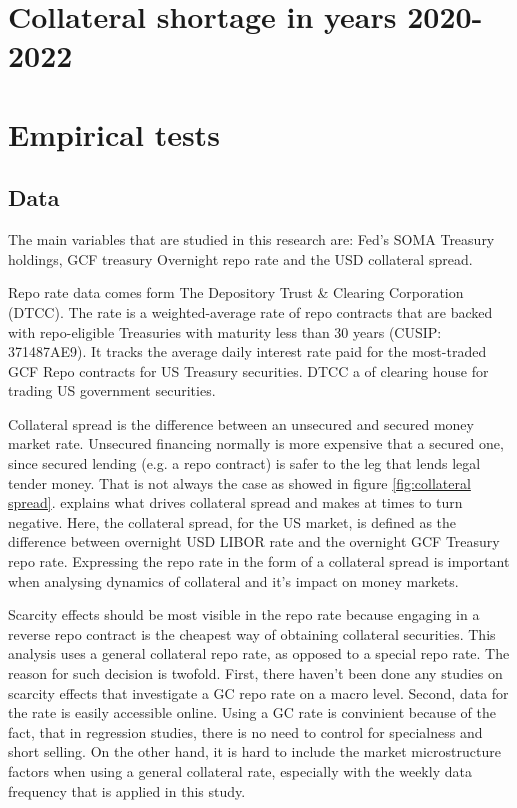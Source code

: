 \documentclass[11pt,a4paper,english,oneside]{article}
\begin{document}
\newpage

\section{Collateral shortage in years 2020-2022} \label{sec:shortage}%

\newpage

\section{Empirical tests} \label{sec:empirical}

\subsection{Data} %

The main variables that are studied in this research are: Fed's SOMA Treasury holdings, GCF treasury Overnight repo rate and the USD collateral spread.

Repo rate data comes form The Depository Trust \& Clearing Corporation (DTCC). The rate is a weighted-average rate of repo contracts that are backed with repo-eligible Treasuries with maturity less than 30 years (CUSIP: 371487AE9). It tracks the average daily interest rate paid for the most-traded GCF Repo contracts for US Treasury securities. DTCC a of clearing house for trading US government securities.

Collateral spread is the difference between an unsecured and secured money market rate. Unsecured financing normally is more expensive that a secured one, since secured lending (e.g. a repo contract) is safer to the leg that lends legal tender money. That is not always the case as showed in figure \ref{fig:collateral spread}. \citet{nyborg2019a} explains what drives collateral spread and makes at times to turn negative. Here, the collateral spread, for the US market, is defined as the difference between overnight USD LIBOR rate and the overnight GCF Treasury repo rate. Expressing the repo rate in the form of a collateral spread is important when analysing dynamics of collateral and it's impact on money markets. %

Scarcity effects should be most visible in the repo rate because engaging in a reverse repo contract is the cheapest way of obtaining collateral securities. This analysis uses a general collateral repo rate, as opposed to a special repo rate. The reason for such decision is twofold. First, there haven't been done any studies on scarcity effects that investigate a GC repo rate on a macro level. Second, data for the rate is easily accessible online. Using a GC rate is convinient because of the fact, that in regression studies, there is no need to control for specialness and short selling. On the other hand, it is hard to include the market microstructure factors when using a general collateral rate, especially with the weekly data frequency that is applied in this study.
\end{document}
